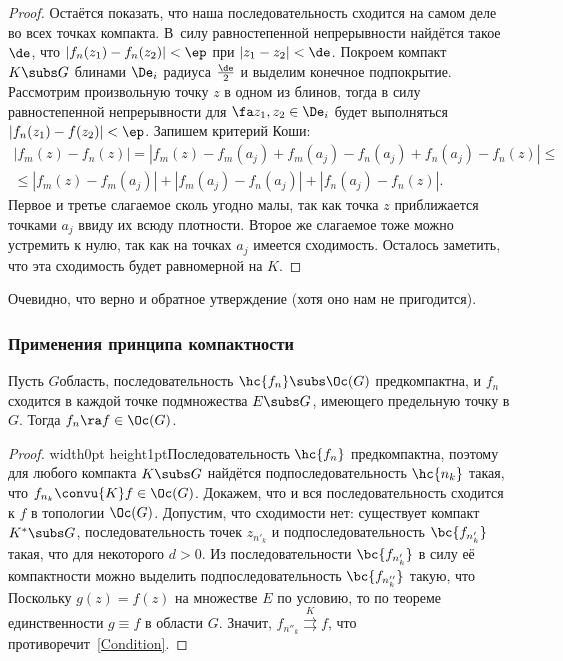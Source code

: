 \documentclass[a4paper]{article}
\def\marksign{$\maltese$}
\newcommand{\markr}{\vrule width0pt height1pt\vadjust{\vbox to 0pt{\vss\hbox to \textwidth{\hfil\raise.1pc\hbox to 0pt{\hskip.75em\marksign\hss}}}}}
\begin{document}
\begin{theorem}
\begin{proof}
Остаётся показать, что наша последовательность сходится на самом деле во всех точках компакта. В~силу
равностепенной непрерывности найдётся такое $\de$, что $|f_n(z_1)-f_n(z_2)|<\ep$ при
$|z_1-z_2|<\de$. Покроем компакт $K \subs G$ блинами $\De_i$ радиуса $\frac{\de}{2}$ и выделим конечное
подпокрытие. Рассмотрим произвольную точку $z$ в одном из блинов, тогда в силу равностепенной непрерывности
для $\fa z_1,z_2\in \De_i$ будет выполняться $|f_n(z_1)-f(z_2)|<\ep$. Запишем критерий Коши:
\begin{multline*}
|f_m(z)-f_n(z)| = |f_m(z) - f_m(a_j) + f_m(a_j) - f_n(a_j) + f_n(a_j) - f_n(z)|\le\\\le
 |f_m(z) - f_m(a_j)| + |f_m(a_j) - f_n(a_j)| + |f_n(a_j) - f_n(z)|.
\end{multline*}
Первое и третье слагаемое сколь угодно малы, так как точка $z$ приближается точками $a_j$ ввиду их всюду плотности.
Второе же слагаемое тоже можно устремить к нулю, так как на точках $a_j$ имеется сходимость. Осталось заметить, что
эта сходимость будет равномерной на $K$.
\end{proof}
\begin{note}
Очевидно, что верно и обратное утверждение (хотя оно нам не пригодится).
\end{note}

\subsubsection{Применения принципа компактности}

\begin{theorem}[Витали]
Пусть $G$\т область, последовательность $\hc{f_n}\subs \Oc(G)$ предкомпактна, и $f_n$ сходится
в каждой точке подмножества $E\subs G$, имеющего предельную точку в $G$.
Тогда $f_n \ra f\in \Oc(G)$.
\end{theorem}
\begin{proof}
\markr Последовательность $\hc{f_n}$  предкомпактна, поэтому для любого компакта $K \subs G$ найдётся подпоследовательность
$\hc{n_k}$ такая, что $f_{n_k} \convu{K} f\in \Oc(G)$. Докажем, что и вся последовательность сходится
к $f$ в топологии $\Oc(G)$. Допустим, что сходимости нет: существует компакт $K^* \subs G$,
последовательность точек $z_{n'_k}$ и подпоследовательность $\bc{f_{n'_k}}$ такая, что
для некоторого $d>0$. Из последовательности $\bc{f_{n'_k}}$ в силу её компактности можно выделить
подпоследовательность $\bc{f_{n''_k}}$ такую, что
Поскольку $g(z)=f(z)$ на множестве $E$ по условию, то по теореме единственности
$g \equiv f$ в области $G$. Значит, $f_{n''_k} \stackrel{K}{\rightrightarrows}f$, что противоречит~\eqref{Condition}.
\end{proof}


\end{theorem}
\end{document}
